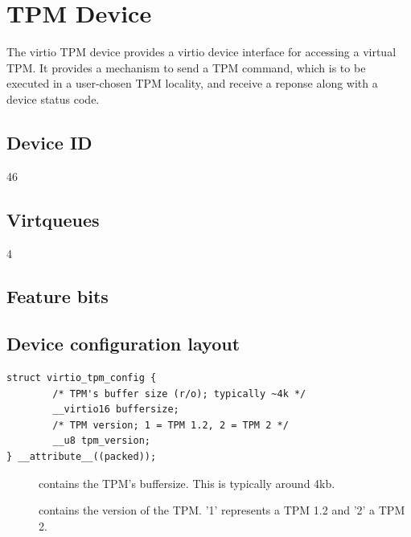 \section{TPM Device}\label{sec:Device Types / TPM Device}

The virtio TPM device provides a virtio device interface for accessing a
virtual TPM. It provides a mechanism to send a TPM command, which is to be
executed in a user-chosen TPM locality, and receive a reponse along with a
device status code.

\subsection{Device ID}\label{sec:Device Types / TPM Device / Device ID}
  46

\subsection{Virtqueues}\label{sec:Device Types / TPM Device / Virtqueues}
\begin{description}
\item[4]
\end{description}

\subsection{Feature bits}\label{sec:Device Types / TPM Device / Feature bits}

\subsection{Device configuration layout}\label{sec:Device Types / TPM Device / Device configuration layout}

\begin{lstlisting}
struct virtio_tpm_config {
        /* TPM's buffer size (r/o); typically ~4k */
        __virtio16 buffersize;
        /* TPM version; 1 = TPM 1.2, 2 = TPM 2 */
        __u8 tpm_version;
} __attribute__((packed));
\end{lstlisting}

\begin{description}
\item[] contains the TPM's buffersize. This is typically
around 4kb.

\item[] contains the version of the TPM. '1' represents a
TPM 1.2 and '2' a TPM 2.
\end{description}

